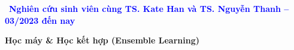 
\newcommand{\cvgroupheader}[2]{%
  \vspace{0.6em}%
  \noindent
  \colorbox{black!5}{%
    \parbox{\dimexpr\linewidth-2\fboxsep\relax}{%
      {\colorbox{blue!10}{\strut\ \textcolor{blue}{\footnotesize\textbf{#2}}\ }}\hspace{0.8em}%
      {\large\textbf{#1}}%
    }%
  }\\[-0.2em]
}

\cvgroupheader{Học máy \& Học kết hợp (Ensemble Learning)}{Nghiên cứu sinh viên cùng TS. Kate Han và TS. Nguyễn Thanh -- 03/2023 đến nay}
